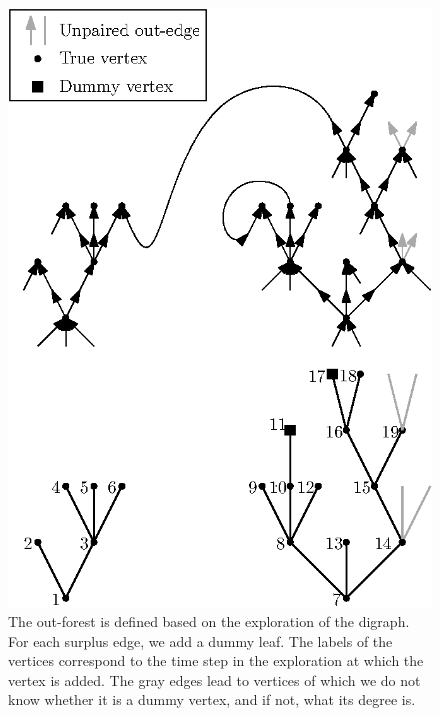 \begin{figure}[htbp]
    \centering
    \includegraphics[scale=1]{Content/Pictures/configuration_model_out_forest.eps}
    \caption{The out-forest is defined based on the exploration of the digraph. For each surplus edge, we add a dummy leaf. The labels of the vertices correspond to the time step in the exploration at which the vertex is added. The gray edges lead to vertices of which we do not know whether it is a dummy vertex, and if not, what its degree is. }
    \label{fig.configuration modeloutforest}
\end{figure}


